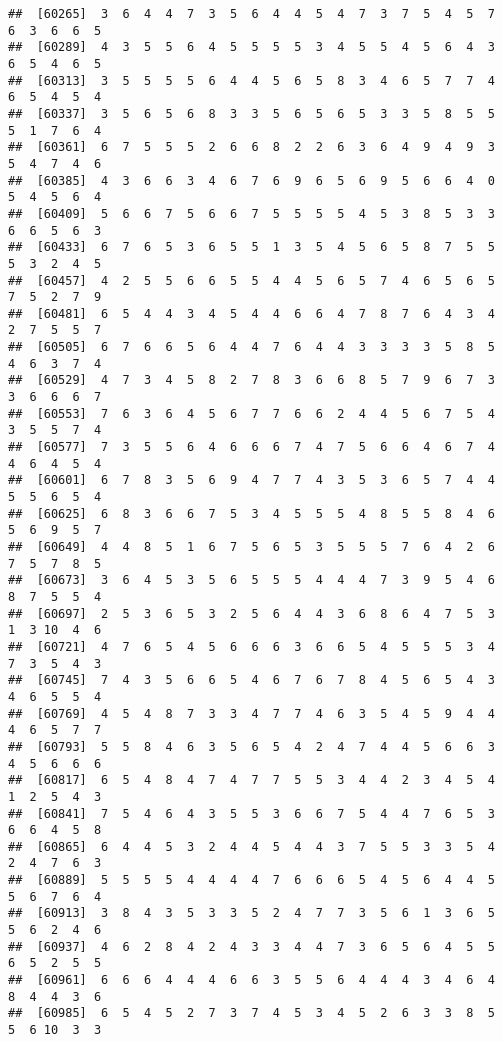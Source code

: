 \documentclass[
]{book}
\begin{document}
\begin{verbatim}
##  [60265]  3  6  4  4  7  3  5  6  4  4  5  4  7  3  7  5  4  5  7  6  3  6  6  5
##  [60289]  4  3  5  5  6  4  5  5  5  5  3  4  5  5  4  5  6  4  3  6  5  4  6  5
##  [60313]  3  5  5  5  5  6  4  4  5  6  5  8  3  4  6  5  7  7  4  6  5  4  5  4
##  [60337]  3  5  6  5  6  8  3  3  5  6  5  6  5  3  3  5  8  5  5  5  1  7  6  4
##  [60361]  6  7  5  5  5  2  6  6  8  2  2  6  3  6  4  9  4  9  3  5  4  7  4  6
##  [60385]  4  3  6  6  3  4  6  7  6  9  6  5  6  9  5  6  6  4  0  5  4  5  6  4
##  [60409]  5  6  6  7  5  6  6  7  5  5  5  5  4  5  3  8  5  3  3  6  6  5  6  3
##  [60433]  6  7  6  5  3  6  5  5  1  3  5  4  5  6  5  8  7  5  5  5  3  2  4  5
##  [60457]  4  2  5  5  6  6  5  5  4  4  5  6  5  7  4  6  5  6  5  7  5  2  7  9
##  [60481]  6  5  4  4  3  4  5  4  4  6  6  4  7  8  7  6  4  3  4  2  7  5  5  7
##  [60505]  6  7  6  6  5  6  4  4  7  6  4  4  3  3  3  3  5  8  5  4  6  3  7  4
##  [60529]  4  7  3  4  5  8  2  7  8  3  6  6  8  5  7  9  6  7  3  3  6  6  6  7
##  [60553]  7  6  3  6  4  5  6  7  7  6  6  2  4  4  5  6  7  5  4  3  5  5  7  4
##  [60577]  7  3  5  5  6  4  6  6  6  7  4  7  5  6  6  4  6  7  4  4  6  4  5  4
##  [60601]  6  7  8  3  5  6  9  4  7  7  4  3  5  3  6  5  7  4  4  5  5  6  5  4
##  [60625]  6  8  3  6  6  7  5  3  4  5  5  5  4  8  5  5  8  4  6  5  6  9  5  7
##  [60649]  4  4  8  5  1  6  7  5  6  5  3  5  5  5  7  6  4  2  6  7  5  7  8  5
##  [60673]  3  6  4  5  3  5  6  5  5  5  4  4  4  7  3  9  5  4  6  8  7  5  5  4
##  [60697]  2  5  3  6  5  3  2  5  6  4  4  3  6  8  6  4  7  5  3  1  3 10  4  6
##  [60721]  4  7  6  5  4  5  6  6  6  3  6  6  5  4  5  5  5  3  4  7  3  5  4  3
##  [60745]  7  4  3  5  6  6  5  4  6  7  6  7  8  4  5  6  5  4  3  4  6  5  5  4
##  [60769]  4  5  4  8  7  3  3  4  7  7  4  6  3  5  4  5  9  4  4  4  6  5  7  7
##  [60793]  5  5  8  4  6  3  5  6  5  4  2  4  7  4  4  5  6  6  3  4  5  6  6  6
##  [60817]  6  5  4  8  4  7  4  7  7  5  5  3  4  4  2  3  4  5  4  1  2  5  4  3
##  [60841]  7  5  4  6  4  3  5  5  3  6  6  7  5  4  4  7  6  5  3  6  6  4  5  8
##  [60865]  6  4  4  5  3  2  4  4  5  4  4  3  7  5  5  3  3  5  4  2  4  7  6  3
##  [60889]  5  5  5  5  4  4  4  4  7  6  6  6  5  4  5  6  4  4  5  5  6  7  6  4
##  [60913]  3  8  4  3  5  3  3  5  2  4  7  7  3  5  6  1  3  6  5  5  6  2  4  6
##  [60937]  4  6  2  8  4  2  4  3  3  4  4  7  3  6  5  6  4  5  5  6  5  2  5  5
##  [60961]  6  6  6  4  4  4  6  6  3  5  5  6  4  4  4  3  4  6  4  8  4  4  3  6
##  [60985]  6  5  4  5  2  7  3  7  4  5  3  4  5  2  6  3  3  8  5  5  6 10  3  3

\end{verbatim}
\end{document}
